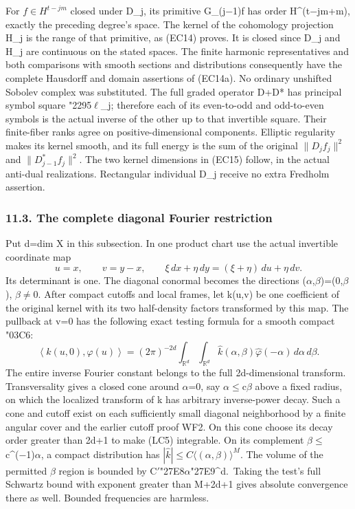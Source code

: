 \documentclass[
  11pt,
]{article}
\begin{document}
For \(f\in H^{t-jm}\) closed under D\_j, its primitive G\_(j−1)f has
order H\^{}(t−jm+m), exactly the preceding degree's space. The kernel of
the cohomology projection H\_j is the range of that primitive, as (EC14)
proves. It is closed since D\_j and H\_j are continuous on the stated
spaces. The finite harmonic representatives and both comparisons with
smooth sections and distributions consequently have the complete
Hausdorff and domain assertions of (EC14a). No ordinary unshifted
Sobolev complex was substituted. The full graded operator D+D* has
principal symbol square {\ReaderSymbols\char"2295}\ensuremath{\ell}\_j; therefore each of its even-to-odd and
odd-to-even symbols is the actual inverse of the other up to that
invertible square. Their finite-fiber ranks agree on
positive-dimensional components. Elliptic regularity makes its kernel
smooth, and its full energy is the sum of the original \(\|D_jf_j\|^2\)
and \(\|D_{j-1}^*f_j\|^2\). The two kernel dimensions in (EC15) follow,
in the actual anti-dual realizations. Rectangular individual D\_j
receive no extra Fredholm assertion.

\subsubsection{11.3. The complete diagonal Fourier
restriction}\label{the-complete-diagonal-fourier-restriction}

Put d=dim X in this subsection. In one product chart use the actual
invertible coordinate map \[
u=x,\qquad v=y-x,\qquad
\xi\,dx+\eta\,dy=(\xi+\eta)\,du+\eta\,dv.
\tag{LC4}
\] Its determinant is one. The diagonal conormal becomes the directions
(\ensuremath{\alpha},\ensuremath{\beta})=(0,\ensuremath{\beta}), \ensuremath{\beta}\ensuremath{\ne}0. After compact cutoffs and local frames, let k(u,v) be
one coefficient of the original kernel with its two half-density factors
transformed by this map. The pullback at v=0 has the following exact
testing formula for a smooth compact {\ReaderSymbols\char"03C6}: \[
\left\langle k(u,0),\varphi(u)\right\rangle
 =(2\pi)^{-2d}\int_{\mathbb R^d}\int_{\mathbb R^d}
       \widehat k(\alpha,\beta)\widehat\varphi(-\alpha)
                                      \,d\alpha\,d\beta.
\tag{LC5}
\] The entire inverse Fourier constant belongs to the full
2d-dimensional transform. Transversality gives a closed cone around \ensuremath{\alpha}=0,
say \textbar \ensuremath{\alpha}\textbar\ensuremath{\leq}c\textbar \ensuremath{\beta}\textbar{} above a fixed radius, on
which the localized transform of k has arbitrary inverse-power decay.
Such a cone and cutoff exist on each sufficiently small diagonal
neighborhood by a finite angular cover and the earlier cutoff proof WF2.
On this cone choose its decay order greater than 2d+1 to make (LC5)
integrable. On its complement
\textbar \ensuremath{\beta}\textbar\ensuremath{\leq}c\^{}(−1)\textbar \ensuremath{\alpha}\textbar, a compact distribution
has \(|\widehat k|\leq C\langle(\alpha,\beta)\rangle^M\). The volume of
the permitted \ensuremath{\beta} region is bounded by C\ensuremath{\prime}{\ReaderSymbols\char"27E8}\ensuremath{\alpha}{\ReaderSymbols\char"27E9}\^{}d.~Taking the test's full
Schwartz bound with exponent greater than M+2d+1 gives absolute
convergence there as well. Bounded frequencies are harmless.
\end{document}
